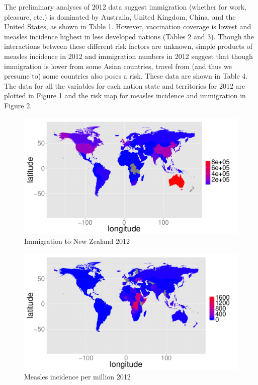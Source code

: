 \documentclass{article}
\begin{document}
The preliminary analyses of 2012 data suggest immigration (whether for work, pleasure, etc.) is dominated by Australia, United Kingdom, China, and the United States, as shown in Table 1. However, vaccination coverage is lowest and measles incidence highest in less developed nations (Tables 2 and 3). Though the interactions between these different risk factors are unknown, simple products of measles incidence in 2012 and immigration numbers in 2012 suggest that though immigration is lower from some Asian countries, travel from (and thus we presume to) some countries also poses a risk. These data are shown in Table 4. The data for all the variables for each nation state and territories for 2012 are plotted in Figure 1 and the risk map for measles incidence and immigration in Figure 2.


\begin{figure}[h!]
\begin{center}
\includegraphics{interimreport1-007}
\end{center}
\caption{Immigration to New Zealand 2012}
\end{figure}

\begin{figure}[h!]
\begin{center}
\includegraphics{interimreport1-008}
\end{center}
\caption{Measles incidence per million 2012}
\end{figure}
\end{document}
